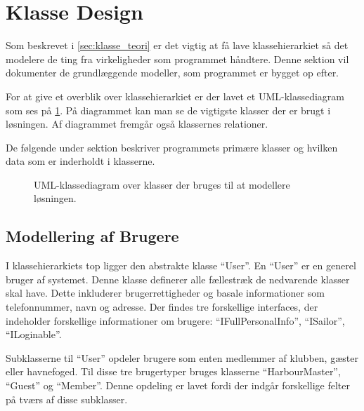 \section{Klasse Design}
\label{sec:klasse_design}
Som beskrevet i \cref{sec:klasse_teori} er det vigtig at få lave klassehierarkiet så det modelere de ting fra virkeligheder som programmet håndtere. Denne sektion vil dokumenter de grundlæggende modeller, som programmet er bygget op efter. 

For at give et overblik over klassehierarkiet er der lavet et UML-klassediagram som ses på \cref{fig:UML}. På diagrammet kan man se de vigtigste klasser der er brugt i løsningen. Af diagrammet fremgår også klassernes relationer.

De følgende under sektion beskriver programmets primære klasser og hvilken data som er inderholdt i klasserne.

\begin{figure}
  \label{fig:UML}  
  \centering
  \vspace*{-4.5cm}
  \thispagestyle{empty}
 	\caption{UML-klassediagram over klasser der bruges til at modellere løsningen.}
 \end{figure}


\subsection{Modellering af Brugere}
\label{sub:brugere_af_programmet}

I klassehierarkiets top ligger den abstrakte klasse \enquote{User}. En \enquote{User} er en generel bruger af systemet. Denne klasse definerer alle fællestræk de nedvarende klasser skal have. Dette inkluderer brugerrettigheder og basale informationer som telefonnummer, navn og adresse. Der findes tre forskellige interfaces, der indeholder forskellige informationer om brugere: \enquote{IFullPersonalInfo}, \enquote{ISailor}, \enquote{ILoginable}.

Subklasserne til \enquote{User} opdeler brugere som enten medlemmer af klubben, gæster eller havnefoged. Til disse tre brugertyper bruges klasserne \enquote{HarbourMaster}, \enquote{Guest} og \enquote{Member}. Denne opdeling er lavet fordi der indgår forskellige felter på tværs af disse subklasser. 


